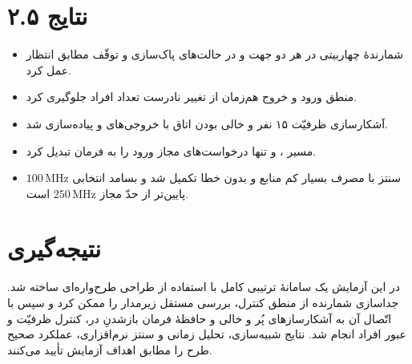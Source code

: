 \documentclass[12pt,a4paper]{article}
\begin{document}
	\section*{۲.۵ نتایج}
	\begin{itemize}
		\item شمارندهٔ چهاربیتی در هر دو جهت و در حالت‌های پاک‌سازی و توقّف مطابق انتظار عمل کرد.
		\item منطق ورود و خروج هم‌زمان از تغییر نادرست تعداد افراد جلوگیری کرد.
		\item آشکارسازی ظرفیّت ۱۵ نفر و خالی بودن اتاق با خروجی‌های  و  پیاده‌سازی شد.
		\item مسیر ،  و  تنها درخواست‌های مجاز ورود را به فرمان  تبدیل کرد.
		\item سنتز با مصرف بسیار کم منابع و بدون خطا تکمیل شد و بسامد انتخابی \(100\,\mathrm{MHz}\) پایین‌تر از حدّ مجاز \(250\,\mathrm{MHz}\) است.
	\end{itemize}

	\section*{نتیجه‌گیری}
	در این آزمایش یک سامانهٔ ترتیبی کامل با استفاده از طراحی طرح‌واره‌ای ساخته شد. جداسازی شمارنده از منطق کنترل، بررسی مستقل زیرمدار را ممکن کرد و سپس با اتّصال آن به آشکارسازهای پُر و خالی و حافظهٔ فرمان بازشدنِ در، کنترل ظرفیّت و عبور افراد انجام شد. نتایج شبیه‌سازی، تحلیل زمانی و سنتز نرم‌افزاری، عملکرد صحیح طرح را مطابق اهداف آزمایش تأیید می‌کنند.
\end{document}
